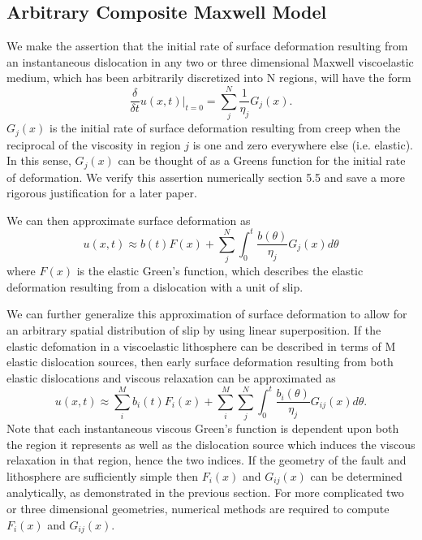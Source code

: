 \documentclass[12pt]{article}
\begin{document}
\subsection{Arbitrary Composite Maxwell Model}
We make the assertion that the initial rate of surface deformation
resulting from an instantaneous dislocation in any two or three
dimensional Maxwell viscoelastic medium, which has been arbitrarily
discretized into N regions, will have the form
\begin{equation}\label{PostseismicInitialVelocity}
  \frac{\delta}{\delta t}u(x,t)\big|_{t=0} = \sum_j^N\frac{1}{\eta_j}G_j(x).
\end{equation}
$G_j(x)$ is the initial rate of surface deformation resulting from
creep when the reciprocal of the viscosity in region $j$ is one and
zero everywhere else (i.e. elastic).  In this sense, $G_j(x)$ can be
thought of as a Greens function for the initial rate of deformation.
We verify this assertion numerically section 5.5 and save a more
rigorous justification for a later paper.

We can then approximate surface deformation as
\begin{equation}
  u(x,t) \approx b(t)F(x) + \sum_j^N\int_0^t \frac{b(\theta)}{\eta_j}G_j(x) d\theta
\end{equation}
where $F(x)$ is the elastic Green's function, which describes the
elastic deformation resulting from a dislocation with a unit of slip.

We can further generalize this approximation of surface deformation to
allow for an arbitrary spatial distribution of slip by using linear
superposition.  If the elastic defomation in a viscoelastic
lithosphere can be described in terms of M elastic dislocation
sources, then early surface deformation resulting from both elastic
dislocations and viscous relaxation can be approximated as
\begin{equation}\label{Postseismic_Approximation}
u(x,t) \approx \sum_i^Mb_i(t)F_i(x) + 
               \sum_i^M\sum_j^N\int_0^t\frac{b_i(\theta)}{\eta_j}G_{ij}(x) d\theta.
\end{equation}
Note that each instantaneous viscous Green's function is dependent
upon both the region it represents as well as the dislocation source
which induces the viscous relaxation in that region, hence the two
indices.  If the geometry of the fault and lithosphere are
sufficiently simple then $F_i(x)$ and $G_{ij}(x)$ can be determined
analytically, as demonstrated in the previous section.  For more
complicated two or three dimensional geometries, numerical methods are
required to compute $F_i(x)$ and $G_{ij}(x)$.
\end{document}
